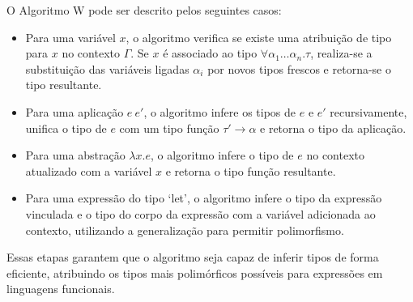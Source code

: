 O Algoritmo W pode ser descrito pelos seguintes casos:

\begin{itemize}
  \item Para uma variável $x$, o algoritmo verifica se existe uma atribuição de tipo para $x$ no contexto $\Gamma$. Se $x$ é associado ao tipo $\forall \alpha_1 \ldots \alpha_n . \tau$, realiza-se a substituição das variáveis ligadas $\alpha_i$ por novos tipos frescos e retorna-se o tipo resultante.
  
  \item Para uma aplicação $e\ e'$, o algoritmo infere os tipos de $e$ e $e'$ recursivamente, unifica o tipo de $e$ com um tipo função $\tau' \to \alpha$ e retorna o tipo da aplicação.
  
  \item Para uma abstração $\lambda x . e$, o algoritmo infere o tipo de $e$ no contexto atualizado com a variável $x$ e retorna o tipo função resultante.
  
  \item Para uma expressão do tipo `let', o algoritmo infere o tipo da expressão vinculada e o tipo do corpo da expressão com a variável adicionada ao contexto, utilizando a generalização para permitir polimorfismo.
\end{itemize}


Essas etapas garantem que o algoritmo seja capaz de inferir tipos de forma eficiente, atribuindo os tipos mais polimórficos possíveis para expressões em linguagens funcionais.